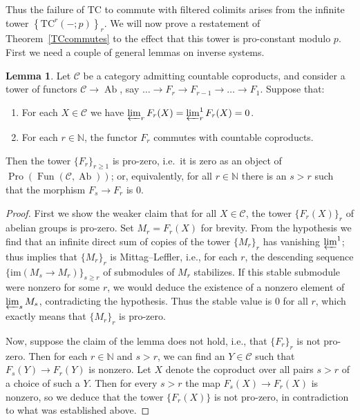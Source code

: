 \documentclass{amsart}
\theoremstyle{definition}
\newtheorem{lemma}[definition]{Lemma}
\newcommand{\TC}{\mathrm{TC}}
\begin{document}
Thus the failure of $\TC$ to commute with filtered colimits arises from the infinite
tower $\left\{\TC^r(-;p)\right\}_r$. 
We will now prove a  restatement of 
Theorem~\ref{TCcommutes} to the effect that this tower is pro-constant modulo
$p$. 
First we need a couple of general lemmas on inverse systems. 

\begin{lemma} 
\label{invlimmzero}
Let $\mathcal{C}$ be a category admitting countable coproducts, and consider a tower of functors $\mathcal{C}\rightarrow \operatorname{Ab}$, say $\ldots \rightarrow F_r\rightarrow F_{r-1}\rightarrow \ldots \rightarrow F_1$.  Suppose that:
\begin{enumerate}
\item For each $X\in\mathcal{C}$ we have $\varprojlim_r F_r(X) = \varprojlim^1_r F_r(X) = 0$.
\item For each $r\in\mathbb{N}$, the functor $F_r$ commutes with countable coproducts.
\end{enumerate}
Then the tower $\{F_r\}_{r \geq 1}$ is pro-zero, i.e.\ it is zero as
an object of $\operatorname{Pro}(\operatorname{Fun}(\mathcal{C},\operatorname{Ab}))$; or, equivalently, for all $r\in\mathbb{N}$ there is an $s>r$ such that the morphism $F_s\rightarrow F_r$ is $0$.
\end{lemma} 
\begin{proof} 
First we show the weaker claim that for all $X\in\mathcal{C}$, the tower
$\{F_r(X)\}_r$ of abelian groups is pro-zero.  Set $M_r = F_r(X)$ for brevity.
From the hypothesis we find that an infinite direct sum of copies of the tower
$\{M_r\}_r$ has vanishing $\varprojlim^1$; thus \cite[Cor.~6]{Emmanouil} implies
that $\{M_r\}_r$ is Mittag--Leffler, i.e., for each $r$, the descending sequence $\{\mathrm{im}(M_s \to M_r)\}_{s \geq r}$ of submodules of $M_r$ stabilizes.  If this stable submodule were nonzero for some $r$, we would deduce the existence of a nonzero element of $\varprojlim_s M_s$, contradicting the hypothesis.  Thus the stable value is $0$ for all $r$, which exactly means that $\{M_r\}_r$ is pro-zero.

Now, suppose the claim of the lemma does not hold, i.e., that $\{F_r\}_r$ is not pro-zero.  Then for each $r\in\mathbb{N}$ and $s>r$, we can find an $Y\in\mathcal{C}$ such that $F_s(Y)\rightarrow F_r(Y)$ is nonzero.  Let $X$ denote the coproduct over all pairs $s>r$ of a choice of such a $Y$.  Then for every $s>r$ the map $F_s(X)\rightarrow F_r(X)$ is nonzero, so we deduce that the tower $\{F_r(X)\}$ is not pro-zero, in contradiction to what was established above.
\end{proof} 
\end{document}

